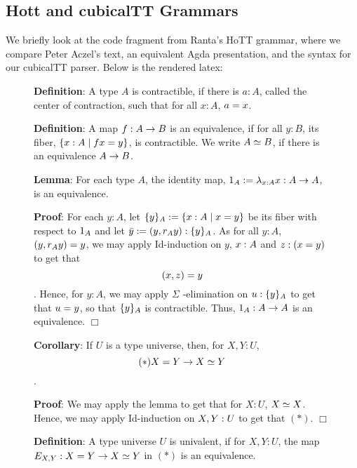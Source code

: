 \subsection{Hott and cubicalTT Grammars} \label{comparison}

We briefly look at the code fragment from Ranta's HoTT grammar, where we compare
Peter Aczel's text, an equivalent Agda presentation, and the syntax for our
cubicalTT parser. Below is the rendered latex:

\begin{figure}[H]
 \textbf{Definition}:
 A type $A$ is contractible, if there is $a : A$, called the center of contraction, such that for all $x : A$, $a = x$.

 \textbf{Definition}:
 A map $f : A \rightarrow B$ is an equivalence, if for all $y : B$, its fiber, $\{ x : A \mid f x = y \}$, is contractible.
 We write $A \simeq B$, if there is an equivalence $A \rightarrow B$.

 \textbf{Lemma}:
 For each type $A$, the identity map, $1_{ A } := \lambda_{x : A} x : A \rightarrow A$, is an equivalence.

 \textbf{Proof}:
 For each $y : A$, let $\{ y \}_{ A } := \{ x : A \mid x = y \}$ be its fiber with respect to $1_{ A }$ and let $\bar{ y } := ( y , r_{ A } y ) : \{ y \}_{ A }$.
 As for all $y : A$, $( y , r_{ A } y ) = y$, we may apply Id-induction on $y$, $x : A$ and $z : ( x = y )$ to get that \[( x , z ) = y\].
 Hence, for $y : A$, we may apply $\Sigma$ -elimination on $u : \{ y \}_{ A }$ to get that $u = y$, so that $\{ y \}_{ A }$ is contractible.
 Thus, $1_{ A } : A \rightarrow A$ is an equivalence.
  $\Box$

 \textbf{Corollary}:
 If $U$ is a type universe, then, for $X , Y : U$, \[(*)X = Y \rightarrow X \simeq Y\].

 \textbf{Proof}:
 We may apply the lemma to get that for $X : U$, $X \simeq X$.
 Hence, we may apply Id-induction on $X , Y : U$ to get that $(*)$.
  $\Box$

 \textbf{Definition}:
 A type universe $U$ is univalent, if for $X , Y : U$, the map $E_ { X , Y }: X = Y \rightarrow X \simeq Y$ in $(*)$ is an equivalence.
\end{figure}

